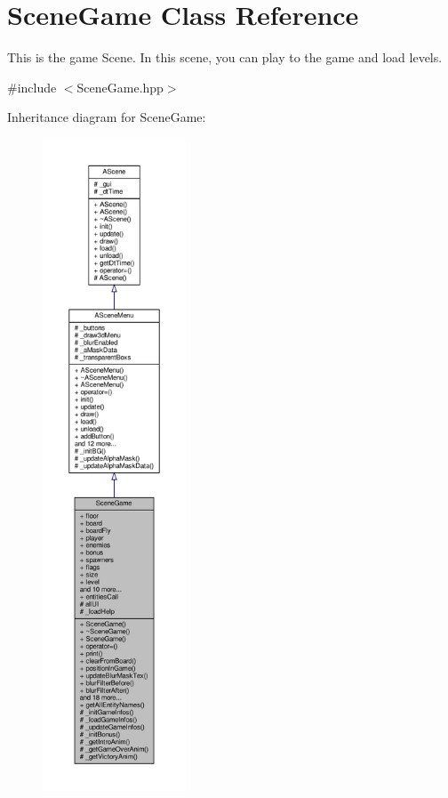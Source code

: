 \hypertarget{class_scene_game}{}\section{Scene\+Game Class Reference}
\label{class_scene_game}


This is the game Scene. In this scene, you can play to the game and load levels.  




{\ttfamily \#include $<$Scene\+Game.\+hpp$>$}



Inheritance diagram for Scene\+Game\+:
\nopagebreak
\begin{figure}[H]
\begin{center}
\leavevmode
\includegraphics[height=550pt]{class_scene_game__inherit__graph}
\end{center}
\end{figure}


